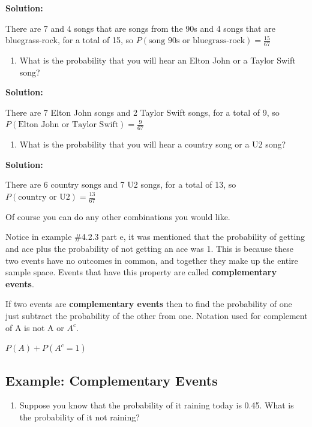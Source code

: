 \documentclass[
]{book}
\providecommand{\tightlist}{%
  \setlength{\itemsep}{0pt}\setlength{\parskip}{0pt}}
\begin{document}
\textbf{Solution:}

There are 7 and 4 songs that are songs from the 90s and 4 songs that are bluegrass-rock, for a total of 15, so \(P(\text{song 90s or bluegrass-rock})=\frac{15}{67}\)

\begin{enumerate}
\def\labelenumi{\alph{enumi}.}
\setcounter{enumi}{5}
\tightlist
\item
  What is the probability that you will hear an Elton John or a Taylor Swift song?
\end{enumerate}

\textbf{Solution:}

There are 7 Elton John songs and 2 Taylor Swift songs, for a total of 9, so \(P(\text{Elton John or Taylor Swift})=\frac{9}{67}\)

\begin{enumerate}
\def\labelenumi{\alph{enumi}.}
\setcounter{enumi}{6}
\tightlist
\item
  What is the probability that you will hear a country song or a U2 song?
\end{enumerate}

\textbf{Solution:}

There are 6 country songs and 7 U2 songs, for a total of 13, so \(P(\text{country or U2})=\frac{13}{67}\)

Of course you can do any other combinations you would like.

Notice in example \#4.2.3 part e, it was mentioned that the probability of getting and ace plus the probability of not getting an ace was 1. This is because these two events have no outcomes in common, and together they make up the entire sample space. Events that have this property are called \textbf{complementary events}.

If two events are \textbf{complementary events} then to find the probability of one just subtract the probability of the other from one. Notation used for complement of A is not A or \(A^{c}\).

\(P(A)+P(A^{c}=1)\)

\hypertarget{example-complementary-events}{%
\subsection{Example: Complementary Events}\label{example-complementary-events}}

\begin{enumerate}
\def\labelenumi{\alph{enumi}.}
\tightlist
\item
  Suppose you know that the probability of it raining today is 0.45. What is the probability of it not raining?
\end{enumerate}
\end{document}
